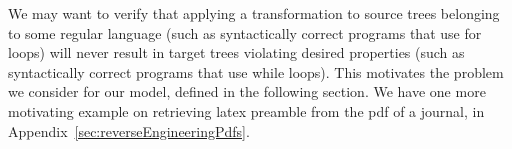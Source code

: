 We may want to verify that applying a transformation to source trees belonging to some regular language (such as syntactically correct programs that use for loops) will never result in target trees violating desired properties (such as syntactically correct programs that use while loops). This motivates the problem we consider for our model, defined in the following section. We have one more motivating example on retrieving latex preamble from the pdf of a journal, in Appendix~\ref{sec:reverseEngineeringPdfs}.
